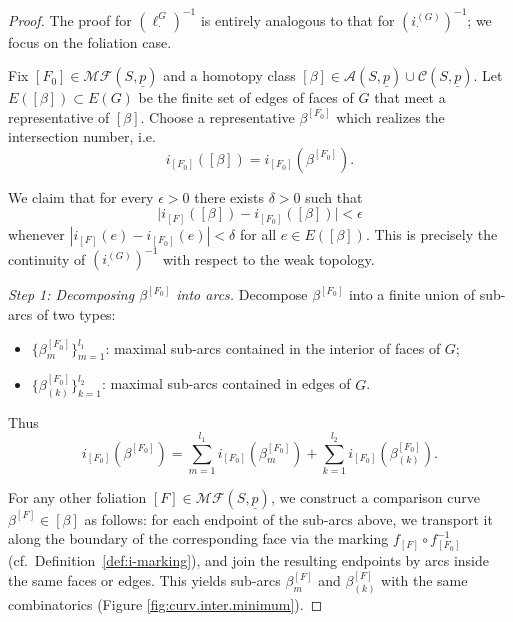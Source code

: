 \documentclass[11pt, letterpaper]{amsart}
\theoremstyle{definition}
\theoremstyle{remark}
\newcommand{\up}{\underline{p}}
\newcommand{\Sp}{(S,\up)}
\newcommand{\iG}{i^{(G)}}
\newcommand{\cMFp}{\mathcal{MF} (S,\up)}
\newcommand{\cC}{\mathcal{C}}
\newcommand{\cA}{\mathcal{A}}
\numberwithin{equation}{section}
\begin{document}
\begin{proof}
The proof for \((\ell^G_{\cdot})^{-1}\) is entirely analogous to that for \((\iG_{\cdot})^{-1}\); we focus on the foliation case.

Fix \([F_0]\in\cMFp\) and a homotopy class \([\beta]\in\cA\Sp\cup\cC\Sp\).
Let \(E([\beta])\subset E(G)\) be the finite set of edges of faces of \(G\) that meet a representative of \([\beta]\).
Choose a representative \(\beta^{[F_0]}\) which realizes the intersection number, i.e.
\[
i_{[F_0]}([\beta]) = i_{[F_0]}(\beta^{[F_0]}).
\]

We claim that for every \(\epsilon>0\) there exists \(\delta>0\) such that
\begin{equation}\label{eq:continuity_inverse}
\bigl|i_{[F]}([\beta]) - i_{[F_0]}([\beta])\bigr| < \epsilon
\end{equation}
whenever \(|i_{[F]}(e)-i_{[F_0]}(e)|<\delta\) for all \(e\in E([\beta])\).
This is precisely the continuity of \((\iG_{\cdot})^{-1}\) with respect to the weak topology.

\smallskip
\noindent
\emph{Step 1: Decomposing \(\beta^{[F_0]}\) into arcs.}
Decompose \(\beta^{[F_0]}\) into a finite union of sub-arcs of two types:
\begin{itemize}
\item
\(\{\beta^{[F_0]}_m\}_{m=1}^{l_1}\): maximal sub-arcs contained in the interior of faces of \(G\);
\item
\(\{\beta^{[F_0]}_{(k)}\}_{k=1}^{l_2}\): maximal sub-arcs contained in edges of \(G\).
\end{itemize}
Thus
\[
i_{[F_0]}(\beta^{[F_0]})
= \sum_{m=1}^{l_1} i_{[F_0]}(\beta^{[F_0]}_m)
  + \sum_{k=1}^{l_2} i_{[F_0]}(\beta^{[F_0]}_{(k)}).
\]

For any other foliation \([F]\in\cMFp\), we construct a comparison curve
\(\beta^{[F]}\in[\beta]\) as follows: for each endpoint of the sub-arcs above,
we transport it along the boundary of the corresponding face via the marking
\(f_{[F]}\circ f_{[F_0]}^{-1}\) (cf.\ Definition~\ref{def:i-marking}),
and join the resulting endpoints by arcs inside the same faces or edges.
This yields sub-arcs \(\beta^{[F]}_m\) and \(\beta^{[F]}_{(k)}\) with the same combinatorics (Figure \ref{fig:curv.inter.minimum}). 


\end{proof}
\end{document}
